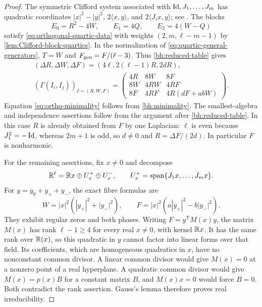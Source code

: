 \begin{proof}
The symmetric Clifford system associated with
$\operatorname{Id},J_1,\ldots,J_m$ has quadratic coordinates
$|x|^2-|y|^2$, $2\langle x,y\rangle$, and
$2\langle J_ix,y\rangle$; see \cite[Section~3]{FKM81}.
The blocks
\begin{equation}\label{eq:orthq-blocks}
 E_0=R^2-4W,\qquad E_1=4Q,\qquad E_2=4(W-Q)
\end{equation}
satisfy \eqref{eq:orthogonal-quartic-data} with weights
$(2,m,\ell-m-1)$ by \cref{lem:Clifford-block-quartics}. In the normalization of
\eqref{eq:quartic-general-generators}, $T=W$ and
$F_{\rm gen}=F/(\ell-3)$. Thus \eqref{bh:reduced-table} gives
\begin{equation}\label{eq:orthq-table}
 \begin{gathered}
 (\Delta R,\Delta W,\Delta F)
 =(4\ell,2(\ell-1)R,2dR),\\
 (\Gamma(I_i,I_j))_{I=(R,W,F)}=
 \begin{pmatrix}
 4R&8W&8F\\8W&4RW&4RF\\8F&4RF&4R(dF+abW)
 \end{pmatrix}.
 \end{gathered}
\end{equation}
Equation \eqref{eq:orthq-minimality} follows from
\eqref{bh:minimality}. The smallest-algebra and independence assertions
follow from the argument after \eqref{bh:reduced-table}.
In this case $R$ is already obtained from $F$ by one Laplacian:
$\ell$ is even because $J_1^2=-\operatorname{Id}$, whereas $2m+1$ is odd, so
$d\ne0$ and $R=\Delta F/(2d)$. In particular $F$ is nonharmonic.

For the remaining assertions, fix $x\ne0$ and decompose
\[
 \mathbb R^\ell=\mathbb R x\oplus U_x^+\oplus U_x^-,\qquad
 U_x^+=\operatorname{span}\{J_1x,\ldots,J_mx\}.
\]
For $y=y_0+y_++y_-$, the exact fibre formulas are
\begin{equation}\label{eq:orthq-fibre}
 W=|x|^2(|y_+|^2+|y_-|^2),\qquad
 F=|x|^2(a|y_+|^2-b|y_-|^2).
\end{equation}
They exhibit regular zeros and both phases. Writing
$F=y^{\mathsf T}M(x)y$, the matrix $M(x)$ has rank $\ell-1\ge4$
for every real $x\ne0$, with kernel $\mathbb R x$. It has the same rank
over $\mathbb R(x)$, so this quadratic in $y$ cannot factor into linear
forms over that field. Its coefficients, which are homogeneous
quadratics in $x$, have no nonconstant common divisor. A linear
common divisor would give $M(x)=0$ at a nonzero point of a real
hyperplane. A quadratic common divisor would give $M(x)=p(x)B$
for a constant matrix $B$, and $M(x)x=0$ would force $B=0$.
Both contradict the rank assertion. Gauss's lemma therefore proves
real irreducibility.


\end{proof}
